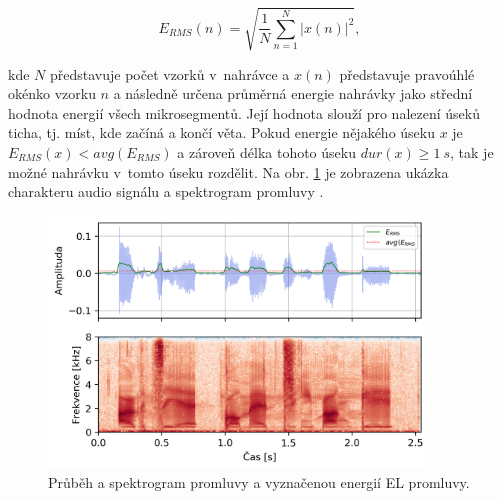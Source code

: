 \begin{equation}
  \label{eq:construction:energy}
  E_{RMS}(n) = \sqrt{\frac{1}{N} \sum_{n=1}^{N} \left| x(n) \right|^2},
\end{equation}

\noindent kde $N$ představuje počet vzorků v~nahrávce a $x(n)$ představuje pravoúhlé okénko vzorku $n$ a následně určena průměrná energie nahrávky jako střední hodnota energií všech mikrosegmentů.
Její hodnota slouží pro nalezení úseků ticha, tj. míst, kde začíná a končí věta.
Pokud energie nějakého úseku $x$ je $E_{RMS}(x) < avg(E_{RMS})$ a zároveň délka tohoto úseku $dur(x) \geq 1\ s$, tak je možné nahrávku v~tomto úseku rozdělit.
Na obr. \ref{fig:construction:el_speech} je zobrazena ukázka charakteru audio signálu a spektrogram promluvy \textit{}.

\begin{figure}[hbpt]
  \centering
  \includegraphics[width=0.9\textwidth]{./parts/ch5-construction/img/energy_spec_el.png}
  \caption[Průběh a spektrogram EL promluvy.]{Průběh a spektrogram promluvy a vyznačenou energií EL promluvy.}
  \label{fig:construction:el_speech}
\end{figure}


